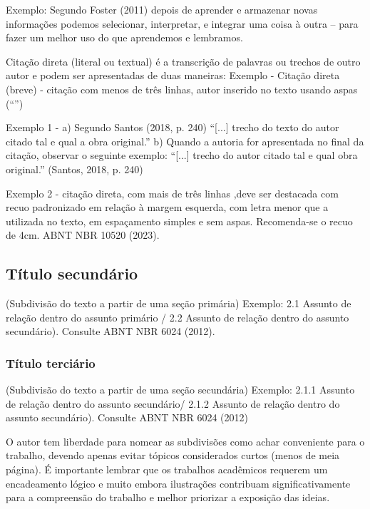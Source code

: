 \documentclass[
article,			%
11pt,				%
twoside,			%
a4paper,			%
section=TITLE,		%
onecolumn,          %
english,			%
brazil,				%
sumario=tradicional
]{abntex2}
\begin{document}
Exemplo:  Segundo Foster (2011) depois de aprender e armazenar novas informações podemos selecionar, interpretar, e integrar uma coisa à outra – para fazer um melhor uso do que aprendemos e lembramos.

Citação direta (literal ou textual) é a transcrição de palavras ou trechos de outro autor e podem ser apresentadas de duas maneiras:
Exemplo - Citação direta (breve) - citação com menos de três linhas, autor inserido no texto usando aspas (“”)

Exemplo 1 - a) Segundo Santos (2018, p. 240) “[...] trecho do texto do autor citado tal e qual a obra original.” b) Quando a autoria for apresentada no final da citação, observar o seguinte exemplo: “[...] trecho do autor citado tal e qual obra original.” (Santos, 2018, p. 240)

Exemplo 2 -  citação direta, com mais de três linhas ,deve ser destacada com recuo padronizado em relação à margem esquerda, com letra menor que a utilizada no texto, em espaçamento simples e sem aspas. Recomenda-se o recuo de 4cm. ABNT NBR 10520 (2023).
    
    \begin{citacao}
        \lipsum[2]
    \end{citacao}
    
    \lipsum[3]

    
    \subsection{Título secundário}
    
  (Subdivisão do texto a partir de uma seção primária) Exemplo: 2.1 Assunto de relação dentro do assunto primário / 2.2 Assunto de relação dentro do assunto secundário). Consulte ABNT NBR 6024 (2012).

  \subsubsection{Título terciário}
(Subdivisão do texto a partir de uma seção secundária) 
Exemplo: 2.1.1 Assunto de relação dentro do assunto secundário/ 2.1.2 Assunto de relação dentro do assunto secundário). Consulte ABNT NBR 6024 (2012)

O autor tem liberdade para nomear as subdivisões como achar conveniente para o trabalho, devendo apenas evitar tópicos considerados curtos (menos de meia página). 
É importante lembrar que os trabalhos acadêmicos requerem um encadeamento lógico e muito embora ilustrações contribuam significativamente para a compreensão do trabalho e melhor priorizar a exposição das ideias.
\end{document}
